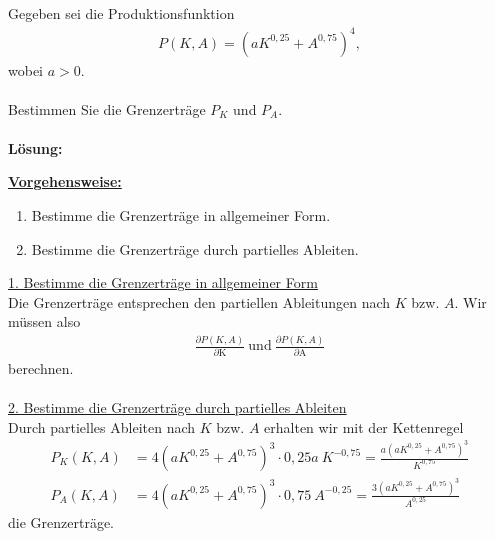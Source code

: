 
\newpage
\subsection*{}
Gegeben sei die Produktionsfunktion
\begin{align*}
P(K,A) = (a K^{0,25} + A^{0,75})^4,
\end{align*}
wobei $a > 0$.
\\
\\
Bestimmen Sie die Grenzerträge $P_K$ und $P_A$.
\\
\\
\textbf{Lösung:}
\begin{mdframed}
\underline{\textbf{Vorgehensweise:}}
\begin{enumerate}
\item Bestimme die Grenzerträge in allgemeiner Form.
\item Bestimme die Grenzerträge durch partielles Ableiten.
\end{enumerate}
\end{mdframed}

\underline{1. Bestimme die Grenzerträge in allgemeiner Form}\\
Die Grenzerträge entsprechen den partiellen Ableitungen nach $K$ bzw. $A$.
Wir müssen also 
\begin{align*}
\frac{\partial P(K,A)}{\partial \mathrm{K}} \
\text{und} \
\frac{\partial P(K,A)}{\partial \mathrm{A}}
\end{align*}
berechnen.\\
\\

\underline{2. Bestimme die Grenzerträge durch partielles Ableiten}\\
Durch partielles Ableiten nach $K$ bzw. $A$ erhalten wir mit der Kettenregel
\begin{align*}
P_K(K,A) &= 4 \left( a K^{0,25} + A^{0,75}\right)^3 \cdot 0,25 a \ K^{-0,75}
= \frac{a \left( a K^{0,25} + A^{0,75}\right)^3 }{K^{0,75}}\\
P_A(K,A) &= 4 \left( a K^{0,25} + A^{0,75}\right)^3 \cdot 0,75 \ A^{-0,25}
= \frac{3 \left( a K^{0,25} + A^{0,75}\right)^3}{A^{0,25}}
\end{align*}
die Grenzerträge.
\newpage
